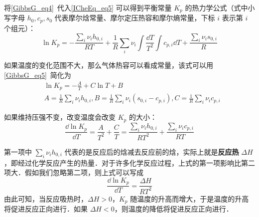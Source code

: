 将\autoref{GibbsG_eq4}~代入\autoref{ICheEq_eq5} 可以得到平衡常量 $K_p$ 的热力学公式（式中小写字母 $h_0,c_p,s_0$ 代表摩尔焓常量、摩尔定压热容和摩尔熵常量，下标 $i$ 表示第 $i$ 个组元）：
\begin{equation}
\ln K_p=-\frac{\sum_i \nu_i h_{0,i}}{RT}+\frac{1}{R}\sum_i\nu_i\int \frac{\dd T}{T^2}\int c_{p,i}\dd T + \frac{\sum_i \nu_i s_{0,i}}{R}
\end{equation}

如果温度的变化范围不大，那么气体热容可以看成常量，该式可以用\autoref{GibbsG_eq5}~简化为
\begin{equation}
\begin{aligned}
&\ln K_p=-\frac{A}{T}+C\ln T+B\\
&A=\frac{1}{R} \sum_i \nu_i h_{0,i},B=\frac{1}{R}\sum_i \nu_i(s_{0,i}-c_{p,i}),C=\frac{1}{R}\sum_i \nu_ic_{p,i}
\end{aligned}
\end{equation}

如果维持压强不变，改变温度会改变 $K_p$ 的大小：
\begin{equation}
\frac{\dd \ln K_p}{\dd T}=\frac{A}{T^2}+\frac{C}{T}=\frac{\sum_i\nu_ih_{0,i}}{RT^2}+\frac{\sum_i\nu_ic_{p,i}}{RT}
\end{equation}

第一项中 $\sum_i \nu_i h_{0,i}$ 代表的是反应后的焓减去反应前的焓，实际上就是\textbf{反应热} $\Delta H$，即经过化学反应产生的热量．对于许多化学反应过程，上式的第一项影响比第二项大．假如我们忽略第二项，则上式可以写成
\begin{equation}
\frac{\dd \ln K_p}{\dd T}=\frac{\Delta H}{RT^2}
\end{equation}
由此可知，当反应吸热时，$\Delta H>0$，$K_p$ 随温度的升高而增大，于是温度的升高将促进反应正向进行．如果 $\Delta H<0$，则温度的降低将促进反应正向进行．